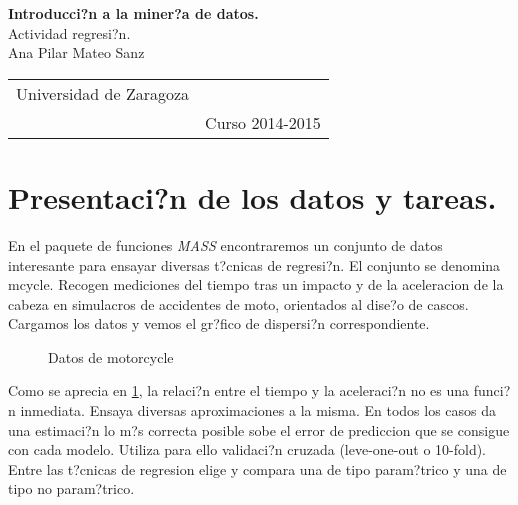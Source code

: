 \documentclass[a4paper, 12pt]{article}
\begin{document}


\begin{titlepage}
  \sffamily
  \begin{center}
		\Huge \textbf{Introducci?n a la miner?a de datos.}\\[3cm]
		\huge Actividad regresi?n. \\[7cm]
		\Large Ana Pilar Mateo Sanz\\[2.5cm]
		\begin{tabular}{l c}
   				Universidad de Zaragoza \\
    			& Curso 2014-2015
   		\end{tabular}
	\end{center}
\end{titlepage}


\tableofcontents
\newpage


\section{Presentaci?n de los datos y tareas.}

En el paquete de funciones \textit{MASS} encontraremos un conjunto de datos interesante para 
ensayar diversas t?cnicas de regresi?n. El conjunto se denomina \textsf{mcycle}. Recogen 
mediciones del tiempo tras un impacto y de la aceleracion de la cabeza en simulacros de 
accidentes de moto, orientados al dise?o de cascos. Cargamos los datos y vemos el gr?fico de 
dispersi?n correspondiente. 


\begin{figure}[hc]\label{fig1}
\begin{center}
  \caption{Datos de motorcycle}
\end{center}
\end{figure}

Como se aprecia en \ref{fig1}, la relaci?n entre el tiempo y la aceleraci?n no es una funci?n 
inmediata. Ensaya diversas aproximaciones a la misma. En todos los casos da una estimaci?n lo 
m?s correcta posible sobe el error de prediccion que se consigue con cada modelo. Utiliza para 
ello validaci?n cruzada (leve-one-out o 10-fold). Entre las t?cnicas de regresion elige y 
compara una de tipo param?trico y una de tipo no param?trico. 

\newpage
\end{document}
